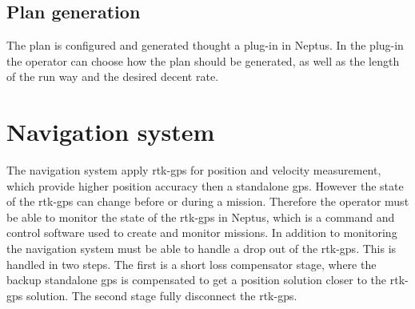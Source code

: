 \subsection{Plan generation}\label{SS:PlanGeneration}
The plan is configured and generated thought a plug-in in Neptus. In the plug-in the operator can choose how the plan should be generated, as well as the length of the run way and the desired decent rate.
\section{Navigation system}
The navigation system apply \gls{rtk-gps} for position and velocity measurement, which provide higher position accuracy then a standalone \gls{gps}. However the state of the \gls{rtk-gps} can change before or during a mission. Therefore the operator must be able to monitor the state of the \gls{rtk-gps} in Neptus, which is a command and control software used to create and monitor missions. In addition to monitoring the navigation system must be able to handle a drop out of the \gls{rtk-gps}. This is handled in two steps. The first is a short loss compensator stage, where the backup standalone \gls{gps} is compensated to get a position solution closer to the \gls{rtk-gps} solution. The second stage fully disconnect the \gls{rtk-gps}.
